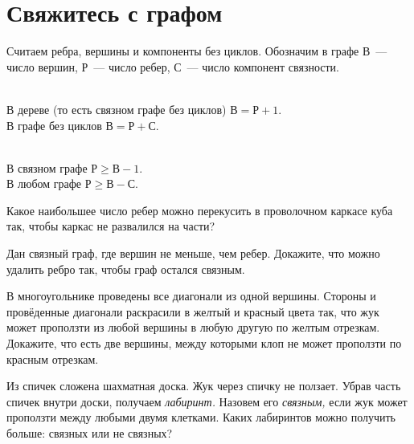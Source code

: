 
\section*{Свяжитесь с графом}



Считаем ребра, вершины и компоненты без циклов.
Обозначим в графе $\text{В}$~--- число вершин, $\text{Р}$~--- число ребер,
$\text{С}$~--- число компонент связности. 

\setcounter{jeolmsubproblem}{0}
\\
\sp
В дереве (то есть связном графе без циклов) $\text{В} = \text{Р} + 1$.
\\
\sp
В графе без циклов $\text{В} = \text{Р} + \text{С}$.

\setcounter{jeolmsubproblem}{0}
\\
\sp
В связном графе $\text{Р} \geq \text{В} - 1$.
\\
\sp
В любом графе $\text{Р} \geq \text{В} - \text{С}$.

\begin{problems}

\item
Какое наибольшее число ребер можно перекусить в проволочном каркасе куба так,
чтобы каркас не развалился на части?

\item
Дан связный граф, где вершин не меньше, чем ребер.
Докажите, что можно удалить ребро так, чтобы граф остался связным.

\item
В многоугольнике проведены все диагонали из одной вершины.
Стороны и провёденные диагонали раскрасили в желтый и красный цвета так, что
жук может проползти из любой вершины в любую другую по желтым отрезкам.
Докажите, что есть две вершины, между которыми клоп не может проползти
по красным отрезкам.

\item
Из спичек сложена шахматная доска.
Жук через спичку не ползает.
Убрав часть спичек внутри доски, получаем \emph{лабиринт.}
Назовем его \emph{связным,} если жук может проползти между любыми двумя клетками.
Каких лабиринтов можно получить больше: связных или не связных?

\end{problems}


